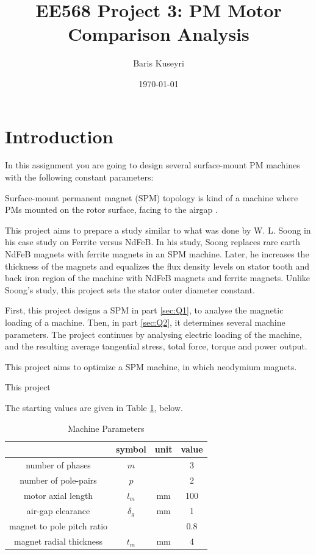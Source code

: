 \documentclass[a4paper, 11pt, titlepage]{article}
\begin{document}
\title{EE568 Project 3: PM Motor Comparison Analysis}
\author{Baris Kuseyri}
\date{\today}
\maketitle

\tableofcontents
\newpage

\section{Introduction}
\label{sec:intro}

In this assignment you are going to design several surface-mount PM machines with the following constant parameters:

Surface-mount permanent magnet (SPM) topology is kind of a machine where PMs mounted on the rotor surface, facing to the airgap \cite{hanselman}.


This project aims to prepare a study similar to what was done by W. L. Soong in his case study on Ferrite versus NdFeB. In his study, Soong replaces rare earth NdFeB magnets with ferrite magnets in an SPM machine. Later, he increases the thickness of the magnets and equalizes the flux density levels on stator tooth and back iron region of the machine with NdFeB magnets and ferrite magnets. Unlike Soong's study, this project sets the stator outer diameter constant.

First, this project designs a SPM in part \ref{sec:Q1}, to analyse the magnetic loading of a machine. Then, in part \ref{sec:Q2}, it determines several machine parameters. The project continues by analysing electric loading of the machine, and the resulting average tangential stress, total force, torque and power output.




This project aims to optimize a SPM machine, in which neodymium magnets. 

This project 

The starting values are given in Table \ref{table:machineParameters}, below.

\begin{table}[ht]
	\begin{center}
		\begin{tabular}{c|c|c|c}
			 & symbol & unit & value \\
			\hline
			number of phases & $m$ & & 3 \\
			number of pole-pairs & $p$ & & 2 \\
			motor axial length & $l_m$ & mm & 100 \\ 
			air-gap clearance & $\delta_g$ & mm & 1 \\
			magnet to pole pitch ratio & & & 0.8 \\
			magnet radial thickness & $t_m$ & mm & 4 \\
			\hline
		\end{tabular}
	\end{center}
	\caption{Machine Parameters}
	\label{table:machineParameters}
\end{table}
	
\end{document}
